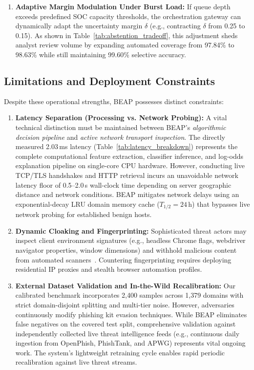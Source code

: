 \documentclass[conference]{IEEEtran}
\begin{document}
\begin{enumerate}[leftmargin=2.5em]
    \item \textbf{Adaptive Margin Modulation Under Burst Load:} If queue depth exceeds predefined SOC capacity thresholds, the orchestration gateway can dynamically adapt the uncertainty margin $\delta$ (e.g., contracting $\delta$ from 0.25 to 0.15). As shown in Table~\ref{tab:abstention_tradeoff}, this adjustment sheds analyst review volume by expanding automated coverage from 97.84\% to 98.63\% while still maintaining 99.60\% selective accuracy.
\end{enumerate}

\subsection{Limitations and Deployment Constraints}\label{operational-limitations}

Despite these operational strengths, BEAP possesses distinct constraints:
\begin{enumerate}[leftmargin=2.5em]
    \item \textbf{Latency Separation (Processing vs. Network Probing):} A vital technical distinction must be maintained between BEAP's \textit{algorithmic decision pipeline} and \textit{active network transport inspection}. The directly measured 2.03\,ms latency (Table~\ref{tab:latency_breakdown}) represents the complete computational feature extraction, classifier inference, and log-odds explanation pipeline on single-core CPU hardware. However, conducting live TCP/TLS handshakes and HTTP retrieval incurs an unavoidable network latency floor of 0.5--2.0\,s wall-clock time depending on server geographic distance and network conditions. BEAP mitigates network delays using an exponential-decay LRU domain memory cache ($T_{1/2} = 24$\,h) that bypasses live network probing for established benign hosts.
    \item \textbf{Dynamic Cloaking and Fingerprinting:} Sophisticated threat actors may inspect client environment signatures (e.g., headless Chrome flags, webdriver navigator properties, window dimensions) and withhold malicious content from automated scanners~\cite{lin2021}. Countering fingerprinting requires deploying residential IP proxies and stealth browser automation profiles.
    \item \textbf{External Dataset Validation and In-the-Wild Recalibration:} Our calibrated benchmark incorporates 2,400 samples across 1,379 domains with strict domain-disjoint splitting and multi-tier noise. However, adversaries continuously modify phishing kit evasion techniques. While BEAP eliminates false negatives on the covered test split, comprehensive validation against independently collected live threat intelligence feeds (e.g., continuous daily ingestion from OpenPhish, PhishTank, and APWG) represents vital ongoing work. The system's lightweight retraining cycle enables rapid periodic recalibration against live threat streams.
\end{enumerate}
\end{document}
